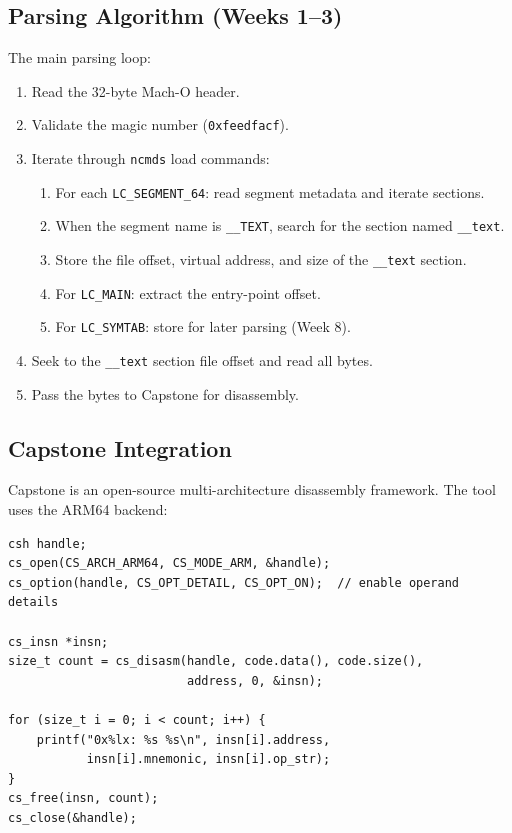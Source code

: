 \documentclass[12pt,a4paper]{article}
\begin{document}
\subsection{Parsing Algorithm (Weeks 1--3)}

The main parsing loop:

\begin{enumerate}
  \item Read the 32-byte Mach-O header.
  \item Validate the magic number (\texttt{0xfeedfacf}).
  \item Iterate through \texttt{ncmds} load commands:
    \begin{enumerate}
      \item For each \texttt{LC\_SEGMENT\_64}: read segment metadata and iterate sections.
      \item When the segment name is \texttt{\_\_TEXT}, search for the section named \texttt{\_\_text}.
      \item Store the file offset, virtual address, and size of the \texttt{\_\_text} section.
      \item For \texttt{LC\_MAIN}: extract the entry-point offset.
      \item For \texttt{LC\_SYMTAB}: store for later parsing (Week 8).
    \end{enumerate}
  \item Seek to the \texttt{\_\_text} section file offset and read all bytes.
  \item Pass the bytes to Capstone for disassembly.
\end{enumerate}

\subsection{Capstone Integration}

Capstone is an open-source multi-architecture disassembly framework. The tool uses the ARM64 backend:

\begin{lstlisting}
csh handle;
cs_open(CS_ARCH_ARM64, CS_MODE_ARM, &handle);
cs_option(handle, CS_OPT_DETAIL, CS_OPT_ON);  // enable operand details

cs_insn *insn;
size_t count = cs_disasm(handle, code.data(), code.size(), 
                         address, 0, &insn);

for (size_t i = 0; i < count; i++) {
    printf("0x%lx: %s %s\n", insn[i].address, 
           insn[i].mnemonic, insn[i].op_str);
}
cs_free(insn, count);
cs_close(&handle);
\end{lstlisting}
\end{document}
